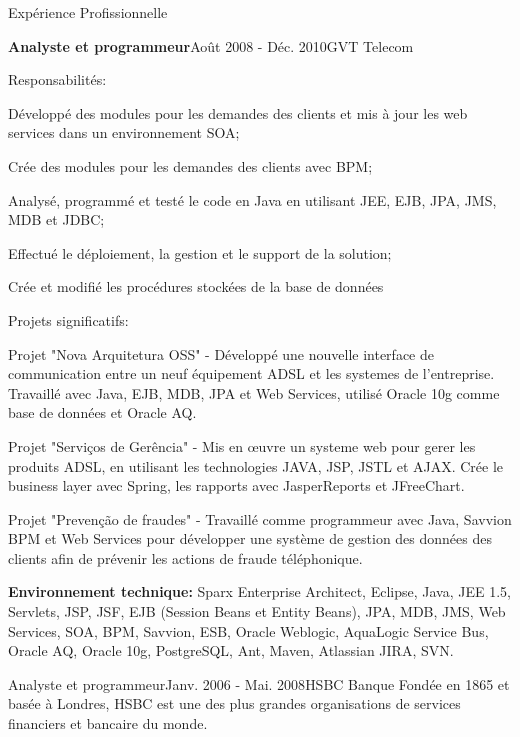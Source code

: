 \documentclass{resume}
\begin{document}
\begin{rSection}{Expérience Profissionnelle}
\begin{rSubsection}{\fontsize{12}{14}\selectfont \bf Analyste et programmeur}{\fontsize{12}{14}\selectfont Août 2008 - Déc. 2010}{\fontsize{12}{14}\selectfont GVT Telecom}{}
    \end{rSubsection}

      \begin{rSubsection}{\fontsize{9}{10}\selectfont Responsabilités:}{}{}{}
        \item Développé des modules pour les demandes des clients et mis à jour les web services dans un environnement SOA;
        \item Crée des modules pour les demandes des clients avec BPM;
        \item Analysé, programmé et testé le code en Java en utilisant JEE, EJB, JPA, JMS, MDB et JDBC;
        \item Effectué le déploiement, la gestion et le support de la solution;
        \item Crée et modifié les procédures stockées de la base de données
      \end{rSubsection}

      \begin{rSubsection}{\fontsize{9}{10}\selectfont Projets significatifs:}{}{}{}
        \item Projet "Nova Arquitetura OSS" - Développé une nouvelle interface de communication entre un neuf équipement ADSL et les systemes de l'entreprise. Travaillé avec Java, EJB, MDB, JPA et Web Services, utilisé Oracle 10g comme base de données et Oracle AQ.
        \item Projet "Serviços de Gerência" - Mis en œuvre un systeme web pour gerer les produits ADSL, en utilisant les technologies JAVA, JSP, JSTL et AJAX. Crée le business layer avec Spring, les rapports avec JasperReports et JFreeChart.
        \item Projet "Prevenção de fraudes" - Travaillé comme programmeur avec Java, Savvion BPM et Web Services pour développer une système de gestion des données des clients afin de prévenir les actions de fraude téléphonique.
      \end{rSubsection}
    
      {\fontsize{8}{9}\selectfont \textbf{Environnement technique:} Sparx Enterprise Architect, Eclipse, Java, JEE 1.5, Servlets, JSP, JSF, EJB (Session Beans et Entity Beans), JPA, MDB, JMS, Web Services, SOA, BPM, Savvion, ESB, Oracle Weblogic, AquaLogic Service Bus, Oracle AQ, Oracle 10g, PostgreSQL, Ant, Maven, Atlassian JIRA, SVN.} \\
    

    \begin{rSubsection}{\fontsize{12}{14}\selectfont Analyste et programmeur}{\fontsize{12}{14}\selectfont Janv. 2006 - Mai. 2008}{\fontsize{12}{14}\selectfont HSBC Banque}{}
    Fondée en 1865 et basée à Londres, HSBC est une des plus grandes organisations de services financiers et bancaire du monde.\\\\


\end{rSubsection}
\end{rSection}
\end{document}

